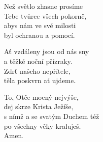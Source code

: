 \begin{translatioMulticol}{3}
Než světlo zhasne prosíme\\
Tebe tvůrce všech pokorně,\\
abys nám ve své milosti\\
byl ochranou a pomocí.\columnbreak

Ať vzdáleny jsou od nás sny\\
a těžké noční přízraky.\\
Zdrť našeho nepřítele,\\
těla poskvrn ať ujdeme.\columnbreak

To, Otče mocný nejvýše,\\
dej skrze Krista Ježíše,\\
s nímž a se svatým Duchem též\\
po všechny věky kraluješ.\\
Amen.
\end{translatioMulticol}
